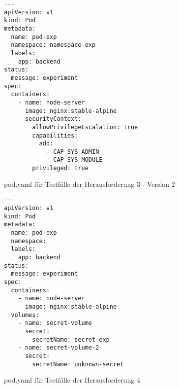 \begin{listing}[htp]
  \begin{verbatim}
---
apiVersion: v1
kind: Pod
metadata:
  name: pod-exp
  namespace: namespace-exp
  labels:
    app: backend
status:    
  message: experiment 
spec:
  containers:
    - name: node-server
      image: nginx:stable-alpine
      securityContext:
        allowPrivilegeEscalation: true
        capabilities:
          add:
            - CAP_SYS_ADMIN
            - CAP_SYS_MODULE
        privileged: true
  \end{verbatim}
  \caption{pod.yaml für Testfälle der Herausforderung 3 - Version 2}
  \label{lst:pod-yaml-file}
\end{listing}

\begin{listing}[htp]
  \begin{verbatim}
---
apiVersion: v1
kind: Pod
metadata:
  name: pod-exp
  namespace: 
  labels:
    app: backend
status:    
  message: experiment  
spec:
  containers:
    - name: node-server
      image: nginx:stable-alpine
  volumes:
    - name: secret-volume
      secret:
        secretName: secret-exp
    - name: secret-volume-2
      secret:
        secretName: unknown-secret
  \end{verbatim}
  \caption{pod.yaml für Testfälle der Herausforderung 4}
  \label{lst:pod-yaml-file}
\end{listing}

